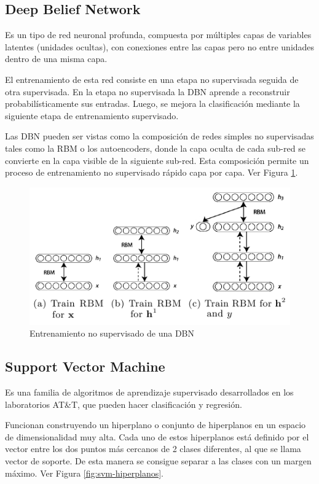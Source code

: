 \subsection{Deep Belief Network}

Es un tipo de red neuronal profunda, compuesta por múltiples capas de variables latentes (unidades ocultas), con conexiones entre las capas pero no entre unidades dentro de una misma capa.

El entrenamiento de esta red consiste en una etapa no supervisada seguida de otra supervisada. En la etapa no supervisada la \ac{DBN} aprende a reconstruir probabilísticamente sus entradas. Luego, se mejora la clasificación mediante la siguiente etapa de entrenamiento supervisado.

Las \ac{DBN} pueden ser vistas como la composición de redes simples no supervisadas tales como la \ac{RBM} o los autoencoders, donde la capa oculta de cada sub-red se convierte en la capa visible de la siguiente sub-red. Esta composición permite un proceso de entrenamiento no supervisado rápido capa por capa. Ver Figura \ref{fig:dbn-train}.

\begin{figure}
    \centering
    \caption{Entrenamiento no supervisado de una DBN}
    \label{fig:dbn-train}
    \includegraphics[width=0.75\linewidth]{graficos/dbn_train.png}
\end{figure}

\subsection{Support Vector Machine}

Es una familia de algoritmos de aprendizaje supervisado desarrollados en los laboratorios AT\&T, que pueden hacer clasificación y regresión.

Funcionan construyendo un hiperplano o conjunto de hiperplanos en un espacio de dimensionalidad muy alta. Cada uno de estos hiperplanos está definido por el vector entre los dos puntos más cercanos de 2 clases diferentes, al que se llama vector de soporte. De esta manera se consigue separar a las clases con un margen máximo. Ver Figura \ref{fig:svm-hiperplanos}.

